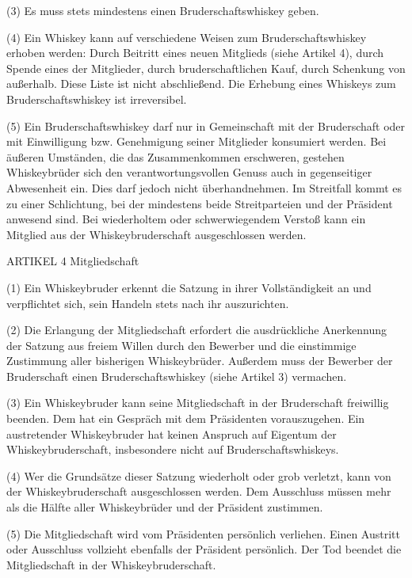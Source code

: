 (3) Es muss stets mindestens einen Bruderschaftswhiskey geben.

(4) Ein Whiskey kann auf verschiedene Weisen zum Bruderschaftswhiskey erhoben werden: Durch Beitritt eines neuen Mitglieds (siehe Artikel 4), durch Spende eines der Mitglieder, durch bruderschaftlichen Kauf, durch Schenkung von außerhalb. Diese Liste ist nicht abschließend. Die Erhebung eines Whiskeys zum Bruderschaftswhiskey ist irreversibel.

(5) Ein Bruderschaftswhiskey darf nur in Gemeinschaft mit der Bruderschaft oder mit Einwilligung bzw. Genehmigung seiner Mitglieder konsumiert werden. Bei äußeren Umständen, die das Zusammenkommen erschweren, gestehen Whiskeybrüder sich den verantwortungsvollen Genuss auch in gegenseitiger Abwesenheit ein. Dies darf jedoch nicht überhandnehmen. Im Streitfall kommt es zu einer Schlichtung, bei der mindestens beide Streitparteien und der Präsident anwesend sind. Bei wiederholtem oder schwerwiegendem Verstoß kann ein Mitglied aus der Whiskeybruderschaft ausgeschlossen werden.



    ARTIKEL 4
    Mitgliedschaft

(1) Ein Whiskeybruder erkennt die  Satzung in ihrer Vollständigkeit an und verpflichtet sich, sein Handeln stets nach ihr auszurichten.

(2) Die Erlangung der Mitgliedschaft erfordert die ausdrückliche Anerkennung der Satzung aus freiem Willen durch den Bewerber und die einstimmige Zustimmung aller bisherigen Whiskeybrüder. Außerdem muss der Bewerber der Bruderschaft einen Bruderschaftswhiskey (siehe Artikel 3) vermachen.

(3) Ein Whiskeybruder kann seine Mitgliedschaft in der Bruderschaft freiwillig beenden. Dem hat ein Gespräch mit dem Präsidenten vorauszugehen. Ein austretender Whiskeybruder hat keinen Anspruch auf Eigentum der Whiskeybruderschaft, insbesondere nicht auf Bruderschaftswhiskeys.

(4) Wer die Grundsätze dieser Satzung wiederholt oder grob verletzt, kann von der Whiskeybruderschaft ausgeschlossen werden. Dem Ausschluss müssen mehr als die Hälfte aller Whiskeybrüder und der Präsident zustimmen.

(5) Die Mitgliedschaft wird vom Präsidenten persönlich verliehen. Einen Austritt oder Ausschluss vollzieht ebenfalls der Präsident persönlich. Der Tod beendet die Mitgliedschaft in der Whiskeybruderschaft.



